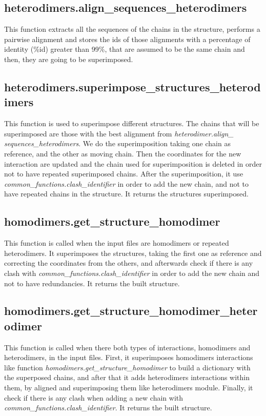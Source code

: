 \documentclass[a4paper,10pt]{report}
\begin{document}
\subsection{heterodimers.align\_sequences\_heterodimers}

This function extracts all the sequences of the chains in the structure, performs a pairwise alignment and stores the ids of those alignments with a percentage of identity (\%id) greater than 99\%, that are assumed to be the same chain and then, they are going to be superimposed. 

\subsection{heterodimers.superimpose\_structures\_heterodimers}

This function is used to superimpose different structures. The chains that will be superimposed are those with the best alignment from \textit{heterodimer.align\_\\sequences\_heterodimers}. 
We do the superimposition taking one chain as reference, and the other as moving chain. Then the coordinates for the new interaction are updated and the chain used for superimposition is deleted in order not to have repeated superimposed chains. 
After the superimposition, it use \textit{common\_functions.clash\_identifier} in order to add the new chain, and not to have repeated chains in the structure. It returns the structures superimposed.

\subsection{homodimers.get\_structure\_homodimer}

This function is called when the input files are homodimers or repeated heterodimers. It superimposes the structures, taking the first one as reference and correcting the coordinates from the others, and afterwards check if there is any clash with  \textit{common\_functions.clash\_identifier} in order to add the new chain and not to have redundancies. It returns the built structure.

\subsection{homodimers.get\_structure\_homodimer\_heterodimer}

This function is called when there both types of interactions, homodimers and heterodimers, in the input files. First, it superimposes homodimers interactions like function \textit{homodimers.get\_structure\_homodimer} to build a dictionary with the superposed chains, and after that it adds heterodimers interactions within them, by aligned and superimposing them like heterodimers module. Finally, it check if there is any clash when adding a new chain with \textit{common\_functions.clash\_identifier}. It returns the built structure.
\end{document}
